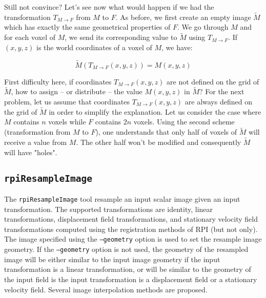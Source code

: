 Still not convince? Let's see now what would happen if we had the transformation $T_{M \rightarrow F}$ from $M$ to $F$. As before, we first create an empty image $\widetilde{M}$ which has exactly the same geometrical properties of $F$. We go through $M$ and for each voxel of $M$, we send its corresponding value to $\widetilde{M}$ using $T_{M \rightarrow F}$. If $(x,y,z)$ is the world coordinates of a voxel of $M$, we have:

\begin{equation}
\widetilde{M}(T_{M \rightarrow F}(x,y,z)) = M(x,y,z)
\label{eq:registration:resampling:2}
\end{equation}

First difficulty here, if coordinates $T_{M \rightarrow F}(x,y,z)$ are not defined on the grid of $\widetilde{M}$, how to assign -- or distribute -- the value $M(x,y,z)$ in $\widetilde{M}$? For the next problem, let us assume that coordinates $T_{M \rightarrow F}(x,y,z)$ are always defined on the grid of $\widetilde{M}$ in order to simplify the explanation. Let us consider the case where $M$ contains $n$ voxels while $F$ contains $2n$ voxels. Using the second scheme (transformation from $M$ to $F$), one understands that only half of voxels of $\widetilde{M}$ will receive a value from $M$. The other half won't be modified and consequently $\widetilde{M}$ will have "holes".


\subsection{\texttt{rpiResampleImage}}

The \texttt{rpiResampleImage} tool resample an input scalar image given an input transformation. The supported transformations are identity, linear transformations, displacement field transformations, and stationary velocity field transformations computed using the registration methods of RPI (but not only). The image specified using the \texttt{--geometry} option is used to set the resample image geometry. If the \texttt{--geometry} option is not used, the geometry of the resampled image will be either similar to the input image geometry if the input transformation is a linear transformation, or will be similar to the geometry of the input field is the input transformation is a displacement field or a stationary velocity field. Several image interpolation methods are proposed.